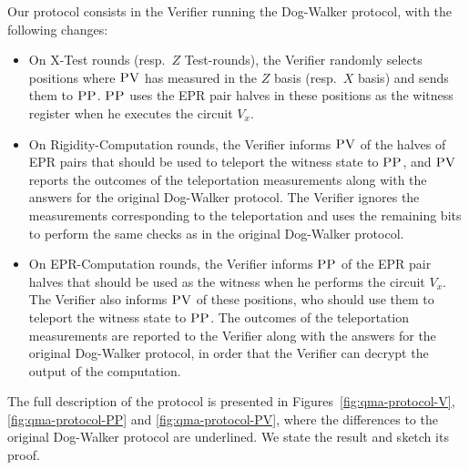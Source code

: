 \documentclass[11pt]{article}
\theoremstyle{remark}
\theoremstyle{definition}
\newcommand{\pv}{\textsc{PV}}
\newcommand{\pp}{\textsc{PP}}
\begin{document}
Our protocol consists in the Verifier running the Dog-Walker protocol,
  with the following changes:
  \begin{itemize}
    \item On X-Test rounds (resp.\ $Z$ Test-rounds), the Verifier randomly selects  positions where
      $\pv$ has measured in the $Z$ basis (resp.\ $X$ basis) and sends them to $\pp$. $\pp$ uses the EPR pair halves in these positions as the witness register when he executes the circuit $V_x$.
    \item On Rigidity-Computation rounds, the Verifier
      informs $\pv$ of the halves of EPR pairs that should be used to teleport the witness
      state to $\pp$, and $\pv$ reports the outcomes of the teleportation
      measurements along with the answers for the original Dog-Walker protocol. The Verifier ignores the measurements corresponding to the teleportation and uses the remaining bits to perform the same checks as in the original Dog-Walker protocol.
      \item On EPR-Computation rounds, the Verifier informs $\pp$ of the
      EPR pair halves that should be used as the witness when he performs the circuit $V_x$.  
      The Verifier
      also informs $\pv$ of these positions, who should use them to teleport the witness
      state to $\pp$.  The outcomes of the teleportation      measurements are reported to the Verifier along with the answers for the original Dog-Walker protocol, in order that the Verifier can decrypt the output of the computation.
  \end{itemize}

The full description of the protocol is presented in Figures~\ref{fig:qma-protocol-V}, \ref{fig:qma-protocol-PP} and \ref{fig:qma-protocol-PV}, where the differences to the original Dog-Walker protocol are underlined. We state the result and sketch its proof. 
\end{document}
